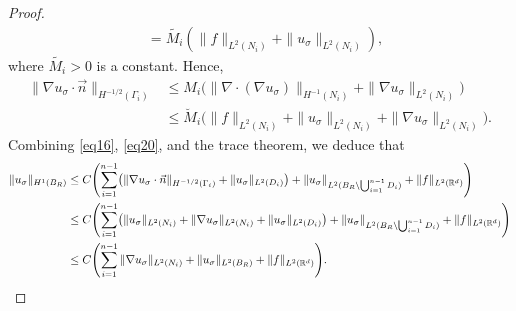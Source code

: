 \documentclass[12pt,reqno]{amsart}
\numberwithin{equation}{section}
\begin{document}
\begin{proof}
\begin{align*}
&= \widetilde{M_i}\left(\|f\|_{L^2(N_i)}+\|u_\sigma\|_{L^2(N_i)}\right),
\end{align*}
where \(\widetilde{M_i}>0\) is a constant.
 Hence,
\begin{align}\label{eq20}
\|\nabla u_\sigma\cdot\vec{n}\|_{H^{-1/2}(\Gamma_i)}
&\le M_i\bigl(\|\nabla\cdot(\nabla u_\sigma)\|_{H^{-1}(N_i)}+\|\nabla u_\sigma\|_{L^2(N_i)}\bigr) \nonumber \\
&\le \breve{M}_i\bigl(\|f\|_{L^2(N_i)}+\|u_\sigma\|_{L^2(N_i)}+\|\nabla u_\sigma\|_{L^2(N_i)}\bigr).
\end{align}
Combining \eqref{eq16}, \eqref{eq20}, and the trace theorem, we deduce that
\begin{align}\label{eq24}
    \|u_\sigma\|_{H^1(B_R)} 
    &\le C \Biggl( \sum_{i=1}^{n-1} \bigl( \|\nabla u_\sigma\cdot\vec{n}\|_{H^{-1/2}(\Gamma_i)} + \|u_\sigma\|_{L^2(D_i)} \bigr) + \|u_\sigma\|_{L^2(B_R \setminus \bigcup_{i=1}^{n-1} D_i)} + \|f\|_{L^2(\mathbb{R}^d)} \Biggr) \notag \\
    &\le C \Biggl( \sum_{i=1}^{n-1} \bigl( \|u_\sigma\|_{L^2(N_i)} + \|\nabla u_\sigma\|_{L^2(N_i)} + \|u_\sigma\|_{L^2(D_i)} \bigr) + \|u_\sigma\|_{L^2(B_R \setminus \bigcup_{i=1}^{n-1} D_i)} + \|f\|_{L^2(\mathbb{R}^d)} \Biggr) \notag \\
    &\le C \Biggl( \sum_{i=1}^{n-1} \|\nabla u_\sigma\|_{L^2(N_i)} + \|u_\sigma\|_{L^2(B_R)} + \|f\|_{L^2(\mathbb{R}^d)} \Biggr).
\end{align}


\end{proof}
\end{document}
